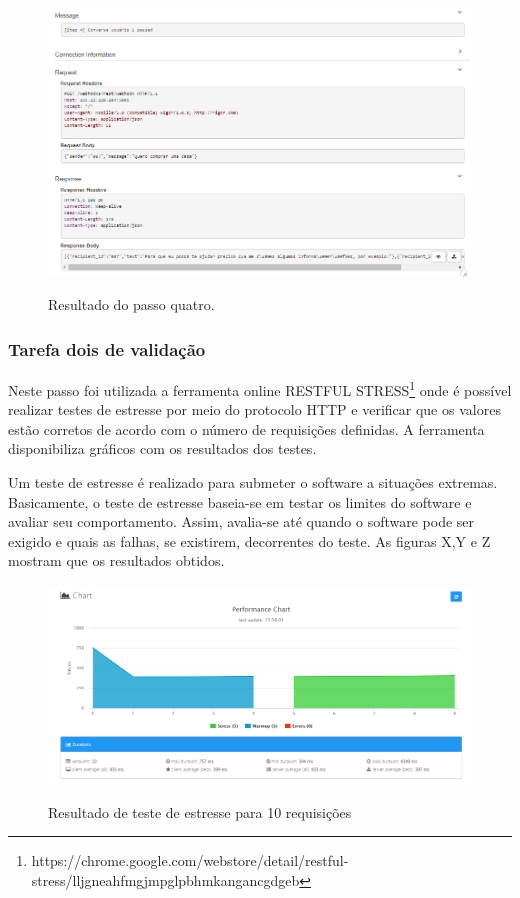 \begin{figure}[H]
  \centering
   \caption{Resultado do passo quatro.}
  \includegraphics[scale=0.5]{Imagens/resultado4.PNG} 
  \label{resultado-teste4}
\end{figure}


\subsubsection{Tarefa dois de validação}
Neste passo foi utilizada a ferramenta online RESTFUL STRESS\footnote{https://chrome.google.com/webstore/detail/restful-stress/lljgneahfmgjmpglpbhmkangancgdgeb} onde é possível realizar testes de estresse por meio do protocolo HTTP e verificar que os valores estão corretos de acordo com o número de requisições definidas. A ferramenta disponibiliza gráficos com os resultados dos testes.

Um teste de estresse é realizado para submeter o software a situações extremas. Basicamente, o teste de estresse baseia-se em testar os limites do software e avaliar seu comportamento. Assim, avalia-se até quando o software pode ser exigido e quais as falhas, se existirem, decorrentes do teste. As figuras X,Y e Z mostram que os resultados obtidos.


\begin{figure}[H]
  \centering
   \caption{Resultado de teste de estresse para 10 requisições}
  \includegraphics[scale=0.5]{Imagens/estresse10.PNG} 
  \label{estresse1}
\end{figure}

